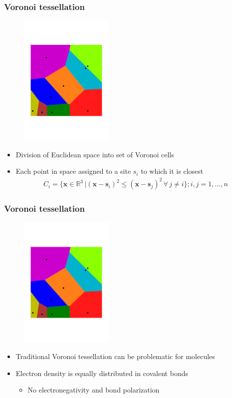 \documentclass[t]{beamer}
\begin{document}
\begin{frame}
	\frametitle{Voronoi tessellation}
	\begin{figure}
		\includegraphics[width=0.4\textwidth]{figures/Voronoi.pdf}
	\end{figure}
	\begin{itemize}
		\item Division of Euclidean space into set of Voronoi cells
		\item Each point in space assigned to a site $s_i$ to which it is closest
		      \begin{align*}
			      C_i = \{ \mathbf{x} \in \mathbb{R}^3 \, | ( \mathbf{x} - \mathbf{s}_i )^2 \leq ( \mathbf{x} - \mathbf{s}_j )^2 \, \forall \, j \neq i \}; i,j=1,...,n
		      \end{align*}
	\end{itemize}
\end{frame}
\begin{frame}
	\frametitle{Voronoi tessellation}
	\begin{figure}
		\includegraphics[width=0.4\textwidth]{figures/Voronoi.pdf}
	\end{figure}
	\begin{itemize}
		\item Traditional Voronoi tessellation can be problematic for molecules \pause
		\item Electron density is equally distributed in covalent bonds
		      \begin{itemize}\normalsize
			      \item No electronegativity and bond polarization
		      \end{itemize}
	\end{itemize}
\end{frame}
\end{document}
